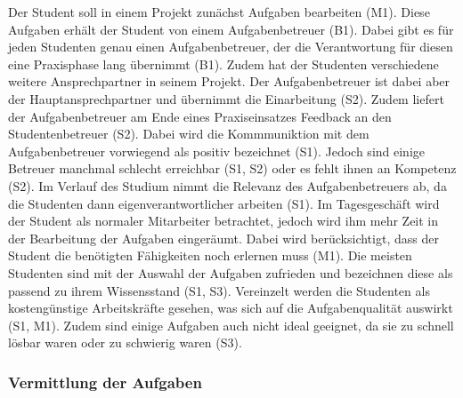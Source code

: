 \documentclass[
  12pt,
  ngerman,
  a4paper,
]{article}
\begin{document}
Der Student soll in einem Projekt zunächst Aufgaben bearbeiten (M1).
Diese Aufgaben erhält der Student von einem Aufgabenbetreuer (B1). Dabei
gibt es für jeden Studenten genau einen Aufgabenbetreuer, der die
Verantwortung für diesen eine Praxisphase lang übernimmt (B1). Zudem hat
der Studenten verschiedene weitere Ansprechpartner in seinem Projekt.
Der Aufgabenbetreuer ist dabei aber der Hauptansprechpartner und
übernimmt die Einarbeitung (S2). Zudem liefert der Aufgabenbetreuer am
Ende eines Praxiseinsatzes Feedback an den Studentenbetreuer (S2). Dabei
wird die Kommmuniktion mit dem Aufgabenbetreuer vorwiegend als positiv
bezeichnet (S1). Jedoch sind einige Betreuer manchmal schlecht
erreichbar (S1, S2) oder es fehlt ihnen an Kompetenz (S2). Im Verlauf
des Studium nimmt die Relevanz des Aufgabenbetreuers ab, da die
Studenten dann eigenverantwortlicher arbeiten (S1). Im Tagesgeschäft
wird der Student als normaler Mitarbeiter betrachtet, jedoch wird ihm
mehr Zeit in der Bearbeitung der Aufgaben eingeräumt. Dabei wird
berücksichtigt, dass der Student die benötigten Fähigkeiten noch
erlernen muss (M1). Die meisten Studenten sind mit der Auswahl der
Aufgaben zufrieden und bezeichnen diese als passend zu ihrem
Wissensstand (S1, S3). Vereinzelt werden die Studenten als
kostengünstige Arbeitskräfte gesehen, was sich auf die Aufgabenqualität
auswirkt (S1, M1). Zudem sind einige Aufgaben auch nicht ideal geeignet,
da sie zu schnell lösbar waren oder zu schwierig waren (S3).

\hypertarget{vermittlung-der-aufgaben}{%
\subsubsection{Vermittlung der
Aufgaben}\label{vermittlung-der-aufgaben}}
\end{document}
